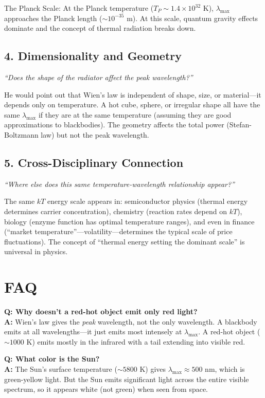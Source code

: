 \documentclass[11pt,openright]{book}
\begin{document}
The Planck Scale: At the Planck temperature ($T_P \sim 1.4 \times 10^{32}$ K), $\lambda_{\max}$ approaches the Planck length ($\sim 10^{-35}$ m). At this scale, quantum gravity effects dominate and the concept of thermal radiation breaks down.

\subsection*{4. Dimensionality and Geometry}
\textit{``Does the shape of the radiator affect the peak wavelength?''}

He would point out that Wien's law is independent of shape, size, or material---it depends only on temperature. A hot cube, sphere, or irregular shape all have the same $\lambda_{\max}$ if they are at the same temperature (assuming they are good approximations to blackbodies). The geometry affects the total power (Stefan-Boltzmann law) but not the peak wavelength.

\subsection*{5. Cross-Disciplinary Connection}
\textit{``Where else does this same temperature-wavelength relationship appear?''}

The same $kT$ energy scale appears in: semiconductor physics (thermal energy determines carrier concentration), chemistry (reaction rates depend on $kT$), biology (enzyme function has optimal temperature ranges), and even in finance (``market temperature''---volatility---determines the typical scale of price fluctuations). The concept of ``thermal energy setting the dominant scale'' is universal in physics.
\section*{FAQ}

\textbf{Q: Why doesn't a red-hot object emit only red light?}\\
\textbf{A:} Wien's law gives the \emph{peak} wavelength, not the only wavelength. A blackbody emits at all wavelengths---it just emits most intensely at $\lambda_{\max}$. A red-hot object ($\sim 1000$ K) emits mostly in the infrared with a tail extending into visible red.

\textbf{Q: What color is the Sun?}\\
\textbf{A:} The Sun's surface temperature ($\sim 5800$ K) gives $\lambda_{\max} \approx 500$ nm, which is green-yellow light. But the Sun emits significant light across the entire visible spectrum, so it appears white (not green) when seen from space.
\end{document}
